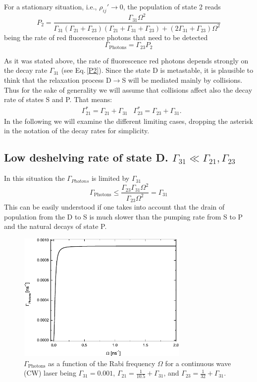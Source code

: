 For a stationary situation, i.e., $\rho_{ij}'\rightarrow0$, the population of state 2 reads
\begin{equation}
\label{P2}
P_2=\frac{\Gamma_{31}\Omega^2}{\Gamma_{31}(\Gamma_{21}+\Gamma_{23})(\Gamma_{21}+\Gamma_{31}+\Gamma_{23})+(2\Gamma_{31}+\Gamma_{23})\Omega^2}
\end{equation}
being the rate of red fluorescence photons that need to be detected
\begin{equation}
\label{Photons}
\Gamma_{\text{Photons}}=\Gamma_{23}P_2
\end{equation}

As it was stated above, the rate of fluorescence red photons depends strongly on the decay rate $\Gamma_{31}$ (see Eq.\,\ref{P2}). Since the state D is metastable, it is plausible to think that the relaxation process D$\rightarrow$S will be mediated mainly by collisions. Thus for the sake of generality we will assume that collisions affect also the decay rate of states S and P. That means:
\begin{align}
\label{Mod_relax}
& \Gamma_{21}^*=\Gamma_{21}+\Gamma_{31}
& \Gamma_{23}^*=\Gamma_{23}+\Gamma_{31}.
\end{align}
In the following we will examine the different limiting cases, dropping the asterisk in the notation of the decay rates for simplicity.

\subsection{Low deshelving rate of state D. $\Gamma_{31}\ll\Gamma_{21}, \Gamma_{23}$}

In this situation the $\Gamma_{Photons}$ is limited by $\Gamma_{31}$
\begin{equation}
\Gamma_{\text{Photons}}\leq\frac{\Gamma_{23}\Gamma_{31}\Omega^2}{\Gamma_{23}\Omega^2}=\Gamma_{31}
\end{equation}
This can be easily understood if one takes into account that the drain of population from the D to S is much slower than the pumping rate from S to P and the natural decays of state P.

\begin{figure}[ht!]
\begin{center}
\includegraphics[width=8.3cm, height=6.3cm]{imgs/LowD2D.pdf}
\caption{\label{LowD2D} $\Gamma_{\text{Photons}}$ as a function of the Rabi frequency $\Omega$ for a continuous wave (CW) laser being $\Gamma_{31}=0.001$\ns, $\Gamma_{21}=\frac{1}{10.5}+\Gamma_{31}$\ns, and $\Gamma_{23}=\frac{1}{32}+\Gamma_{31}$\ns. }
\end{center}
\end{figure}

